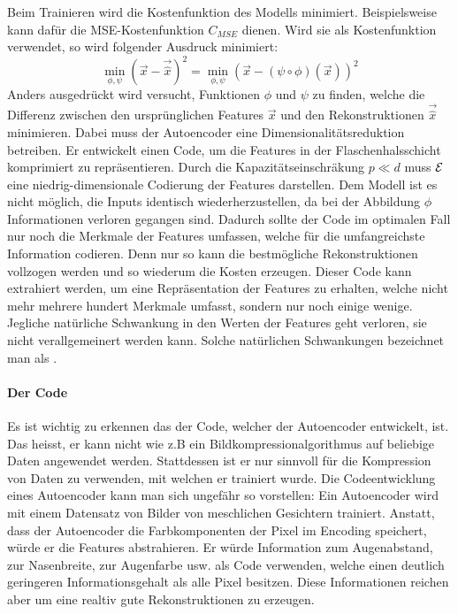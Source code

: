 Beim Trainieren wird die Kostenfunktion des Modells minimiert.
Beispielsweise kann dafür die MSE-Kostenfunktion $C_{MSE}$ dienen.
Wird sie als Kostenfunktion verwendet, so wird folgender Ausdruck minimiert:
\begin{equation}
  \min_{\phi,\psi} {(\vec{x} - \vec{\hat{x}})}^2 = \min_{\phi,\psi} {(\vec{x} - (\psi \circ \phi)(\vec{x}))}^2
\end{equation}
Anders ausgedrückt wird versucht, Funktionen $\phi$ und $\psi$ zu finden, welche
die Differenz zwischen den ursprünglichen Features $\vec{x}$ und den Rekonstruktionen
$\vec{\hat{x}}$ minimieren. Dabei muss der Autoencoder
eine Dimensionalitätsreduktion betreiben. Er entwickelt einen Code, um die Features
in der Flaschenhalsschicht komprimiert zu repräsentieren. Durch die
Kapazitätseinschräkung $p \ll d$ muss $\mathcal{E}$ eine niedrig-dimensionale
Codierung der Features darstellen. Dem Modell ist es nicht möglich, die Inputs
identisch wiederherzustellen, da bei der Abbildung $\phi$ Informationen verloren
gegangen sind. Dadurch sollte der Code im optimalen Fall nur noch die Merkmale
der Features umfassen, welche für die umfangreichste Information codieren. Denn
nur so kann die bestmögliche Rekonstruktionen vollzogen werden und so wiederum
die Kosten erzeugen.
Dieser Code kann extrahiert werden, um eine Repräsentation der Features zu
erhalten, welche nicht mehr mehrere hundert Merkmale umfasst, sondern nur noch einige
wenige. Jegliche natürliche Schwankung in den Werten der Features geht
verloren, sie nicht verallgemeinert werden kann. Solche natürlichen Schwankungen
bezeichnet man als .

\paragraph{Der Code}
Es ist wichtig zu erkennen das der Code, welcher der Autoencoder entwickelt,
 ist. Das heisst, er kann nicht wie z.B ein
Bildkompressionalgorithmus auf beliebige Daten angewendet werden. Stattdessen
ist er nur sinnvoll für die Kompression von Daten zu verwenden, mit welchen er trainiert
wurde.
\para{}
Die Codeentwicklung eines Autoencoder kann man sich ungefähr so vorstellen:
Ein Autoencoder wird mit einem Datensatz von Bilder von meschlichen Gesichtern trainiert.
Anstatt, dass der Autoencoder die Farbkomponenten der Pixel im Encoding speichert, würde er
die Features abstrahieren. Er würde Information zum Augenabstand, zur
Nasenbreite, zur Augenfarbe usw. als Code verwenden, welche einen deutlich geringeren
Informationsgehalt als alle Pixel besitzen. Diese Informationen reichen aber um
eine realtiv gute Rekonstruktionen zu erzeugen.



